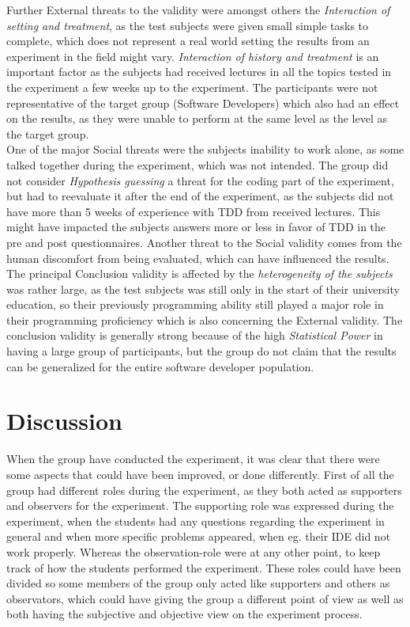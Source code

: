 \documentclass{sig-alternate-05-2015}
\begin{document}
Further External threats to the validity were amongst others the \textit{Interaction of setting and treatment}, as the test subjects were given small simple tasks to complete, which does not represent a real world setting the results from an experiment in the field might vary. \textit{Interaction of history and treatment} is an important factor as the subjects had received lectures in all the topics tested in the experiment a few weeks up to the experiment. The participants were not representative of the target group (Software Developers) which also had an effect on the results, as they were unable to perform at the same level as the level as the target group.\\

One of the major Social threats were the subjects inability to work alone, as some talked together during the experiment, which was not intended. The group did not consider \textit{Hypothesis guessing} a threat for the coding part of the experiment, but had to reevaluate it after the end of the experiment, as the subjects did not have more than 5  weeks of experience with TDD from received lectures. This might have impacted the subjects answers more or less in favor of TDD in the pre and post questionnaires. Another threat to the Social validity comes from the human discomfort from being evaluated, which can have influenced the results.\\

The principal Conclusion validity is affected by the \textit{heterogeneity of the subjects} was rather large, as the test subjects was still only in the start of their university education, so their previously programming ability still played a major role in their programming proficiency which is also concerning the External validity. The conclusion validity is generally strong because of the high \textit{Statistical Power} in having a large group of participants, but the group do not claim that the results can be generalized for the entire software developer population. 

\section{Discussion}

When the group have conducted the experiment, it was clear that there were some aspects that could have been improved, or done differently. First of all the group had different roles during the experiment, as they both acted as supporters and observers for the experiment. The supporting role was expressed during the experiment, when the students had any questions regarding the experiment in general and when more specific problems appeared, when eg. their IDE did not work properly. Whereas the observation-role were at any other point, to keep track of how the students performed the experiment. These roles could have been divided so some members of the group only acted like supporters and others as observators, which could have giving the group a different point of view as well as both having the subjective and objective view on the experiment process.\\
\end{document}
